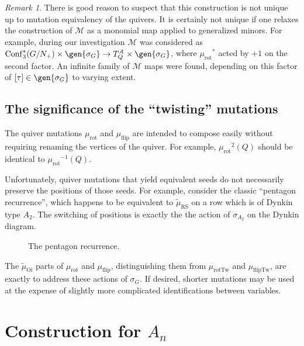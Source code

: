 \documentclass{amsart}
\theoremstyle{plain}
\theoremstyle{definition}
\theoremstyle{remark}
\newtheorem{remark}[theorem]{Remark}
\newcommand{\conftoquiv}{\mathcal{M}}
\newcommand{\seedAtorus}{T^{\mathcal{A}}}
\newcommand{\muflip}{{\mu_{\text{flip}}}}
\newcommand{\mufliptwist}{{\mu_{\text{flipTw}}}}
\newcommand{\murot}{{\mu_{\text{rot}}}}
\newcommand{\murottwist}{{\mu_{\text{rotTw}}}}
\newcommand{\muint}[1]{\widetilde{\mu}_{\text{#1}}}
\newcommand{\murowperm}{\muint{RS}}
\DeclareMathOperator{\Conf}{Conf}
\DeclarePairedDelimiter\gen\langle\rangle
\begin{document}
  \begin{remark}
    There is good reason to suspect that this construction is not unique
    up to mutation equivalency of the quivers. It is certainly not
    unique if one relaxes the construction of $\conftoquiv$ as a
    monomial map applied to generalized minors. For example, during our
    investigation $\conftoquiv$ was considered as
    $\Conf_3^{\ast}(G/N_{+}) \times \gen{\sigma_G} \to \seedAtorus_Q
    \times \gen{\sigma_G}$, where $\murot^{\ast}$ acted by $+1$ on the
    second factor. An infinite family of $\conftoquiv$ maps were found,
    depending on this factor of $[\tau] \in \gen{\sigma_G}$ to varying
    extent.
  \end{remark}

  \subsection{The significance of the ``twisting'' mutations}

  \label{sec:what-does-the-twist-do}

  The quiver mutations $\murot$ and $\muflip$ are intended to compose
  easily without requiring renaming the vertices of the quiver. For
  example, $\murot^2(Q)$ should be identical to $\murot^{-1}(Q)$.

  Unfortunately, quiver mutations that yield equivalent seeds do not
  necessarily preserve the positions of those seeds. For example,
  consider the classic ``pentagon recurrence'', which happens to be
  equivalent to $\murowperm$ on a row which is of Dynkin type $A_2$. The
  switching of positions is exactly the the action of $\sigma_{A_2}$ on
  the Dynkin diagram.

  \begin{figure}[h]
    \centering
    

    \caption{The pentagon recurrence.
      \label{fig:pentagon-recurrence}
    }
  \end{figure}

  The $\muint{Oi}$ parts of $\murot$ and $\muflip$, distinguishing them
  from $\murottwist$ and $\mufliptwist$, are exactly to address these
  actions of $\sigma_G$. If desired, shorter mutations may be used at
  the expense of slightly more complicated identifications between
  variables.

  \section{Construction for \texorpdfstring{$A_n$}{A\_n}}
\end{document}
